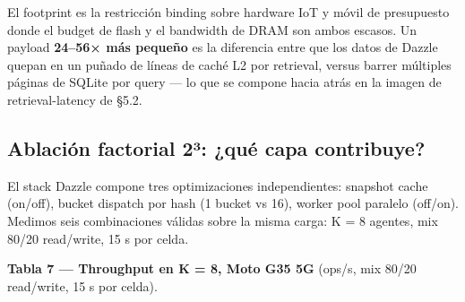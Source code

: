 El footprint es la restricción binding sobre hardware IoT y móvil de presupuesto
donde el budget de flash y el bandwidth de DRAM son ambos escasos. Un payload
\textbf{24--56× más pequeño} es la diferencia entre que los datos de Dazzle
quepan en un puñado de líneas de caché L2 por retrieval, versus barrer múltiples
páginas de SQLite por query --- lo que se compone hacia atrás en la imagen de
retrieval-latency de §5.2.

\subsection{Ablación factorial 2³: ¿qué capa
contribuye?}\label{ablaciuxf3n-factorial-2uxb3-quuxe9-capa-contribuye}

El stack Dazzle compone tres optimizaciones independientes: snapshot cache
(on/off), bucket dispatch por hash (1 bucket vs 16), worker pool paralelo
(off/on). Medimos seis combinaciones válidas sobre la misma carga: K = 8
agentes, mix 80/20 read/write, 15 s por celda.

\textbf{Tabla 7 --- Throughput en K = 8, Moto G35 5G} (ops/s, mix 80/20
read/write, 15 s por celda).

